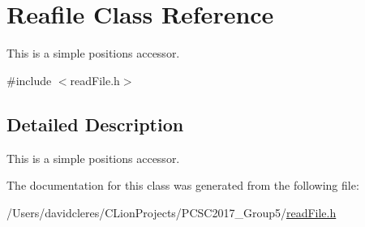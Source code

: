 \hypertarget{class_reafile}{}\section{Reafile Class Reference}
\label{class_reafile}


This is a simple positions accessor.  




{\ttfamily \#include $<$read\+File.\+h$>$}



\subsection{Detailed Description}
This is a simple positions accessor. 

The documentation for this class was generated from the following file\+:\begin{DoxyCompactItemize}
\item 
/\+Users/davidcleres/\+C\+Lion\+Projects/\+P\+C\+S\+C2017\+\_\+\+Group5/\mbox{\hyperlink{read_file_8h}{read\+File.\+h}}\end{DoxyCompactItemize}
